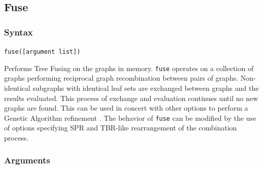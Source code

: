 \subsection{Fuse}
	\subsubsection{Syntax}
		\texttt{fuse([argument list])}
		
	\begin{phygdescription}
	
		{Performs Tree Fusing \citep{goloboff1999, moilanen1999, moilanen2001} on the graphs
		in memory. \texttt{fuse} operates on a collection of graphs performing reciprocal graph 
		recombination between pairs of graphs. Non-identical subgraphs with identical leaf sets 
		are exchanged between graphs and the results evaluated. This process of exchange 
		and evaluation continues until no new graphs are found. This can be used in concert 
		with other options to perform a Genetic Algorithm refinement \citep{Holland1975}. The 
		behavior of \texttt{fuse} can be modified by the use of options specifying SPR and 
		TBR-like rearrangement of the combination process.}
		
	\end{phygdescription}
	
	\subsubsection{Arguments}
	
